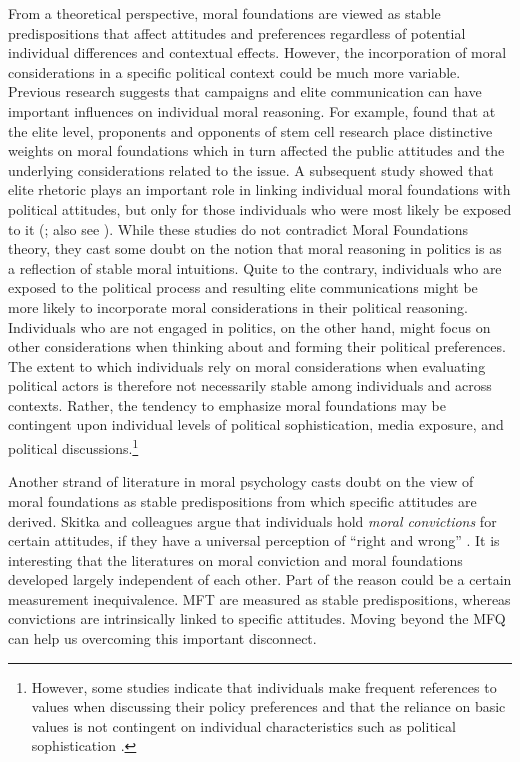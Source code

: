 \documentclass[12pt]{article}
\begin{document}
From a theoretical perspective, moral foundations are viewed as stable predispositions that affect attitudes and preferences regardless of potential individual differences and contextual effects. However, the incorporation of moral considerations in a specific political context could be much more variable. Previous research suggests that campaigns and elite communication can have important influences on individual moral reasoning. For example, \citet{clifford2013words} found that at the elite level, proponents and opponents of stem cell research place distinctive weights on moral foundations which in turn affected the public attitudes and the underlying considerations related to the issue. A subsequent study showed that elite rhetoric plays an important role in linking individual moral foundations with political attitudes, but only for those individuals who were most likely be exposed to it (\citealt{clifford2015concerns}; also see \citealt{day2014shifting}). While these studies do not contradict Moral Foundations theory, they cast some doubt on the notion that moral reasoning in politics is as a reflection of stable moral intuitions. Quite to the contrary, individuals who are exposed to the political process and resulting elite communications might be more likely to incorporate moral considerations in their political reasoning. Individuals who are not engaged in politics, on the other hand, might focus on other considerations when thinking about and forming their political preferences. The extent to which individuals rely on moral considerations when evaluating political actors is therefore not necessarily stable among individuals and across contexts. Rather, the tendency to emphasize moral foundations may be contingent upon individual levels of political sophistication, media exposure, and political discussions.\footnote{However, some studies indicate that individuals make frequent references to values when discussing their policy preferences \citep{feldman1992political} and that the reliance on basic values is not contingent on individual characteristics such as political sophistication \citep[e.g.][]{goren2001core,goren2004political,marietta2007values}.}

Another strand of literature in moral psychology casts doubt on the view of moral foundations as stable predispositions from which specific attitudes are derived. Skitka and colleagues argue that individuals hold \textit{moral convictions} for certain attitudes, if they have a universal perception of ``right and wrong'' \citep{skitka2005moral,mullen2006exploring,skitka2010psychology}. It is interesting that the literatures on moral conviction and moral foundations developed largely independent of each other. Part of the reason could be a certain measurement inequivalence. MFT are measured as stable predispositions, whereas convictions are intrinsically linked to specific attitudes. Moving beyond the MFQ can help us overcoming this important disconnect.
\end{document}
